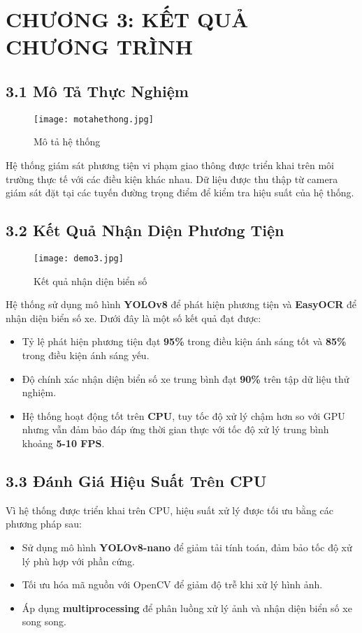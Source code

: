 \documentclass[conference]{IEEEtran}
\begin{document}
\section{CHƯƠNG 3: KẾT QUẢ CHƯƠNG TRÌNH}

\subsection{3.1 Mô Tả Thực Nghiệm}
\begin{figure}[H]
    \centering
    \texttt{[image: motahethong.jpg]} %
    \caption{Mô tả hệ thống}
    \label{fig:traffic_monitoring}
\end{figure}
Hệ thống giám sát phương tiện vi phạm giao thông được triển khai trên môi trường thực tế với các điều kiện khác nhau. Dữ liệu được thu thập từ camera giám sát đặt tại các tuyến đường trọng điểm để kiểm tra hiệu suất của hệ thống.

\subsection{3.2 Kết Quả Nhận Diện Phương Tiện}
\begin{figure}[H]
    \centering
    \texttt{[image: demo3.jpg]} %
    \caption{Kết quả nhận diện biển số}
    \label{fig:traffic_monitoring}
\end{figure}
Hệ thống sử dụng mô hình \textbf{YOLOv8} để phát hiện phương tiện và \textbf{EasyOCR} để nhận diện biển số xe. Dưới đây là một số kết quả đạt được:
\begin{itemize}
    \item Tỷ lệ phát hiện phương tiện đạt \textbf{95\%} trong điều kiện ánh sáng tốt và \textbf{85\%} trong điều kiện ánh sáng yếu.
    \item Độ chính xác nhận diện biển số xe trung bình đạt \textbf{90\%} trên tập dữ liệu thử nghiệm.
    \item Hệ thống hoạt động tốt trên \textbf{CPU}, tuy tốc độ xử lý chậm hơn so với GPU nhưng vẫn đảm bảo đáp ứng thời gian thực với tốc độ xử lý trung bình khoảng \textbf{5-10 FPS}.
\end{itemize}

\subsection{3.3 Đánh Giá Hiệu Suất Trên CPU}
Vì hệ thống được triển khai trên CPU, hiệu suất xử lý được tối ưu bằng các phương pháp sau:
\begin{itemize}
    \item Sử dụng mô hình \textbf{YOLOv8-nano} để giảm tải tính toán, đảm bảo tốc độ xử lý phù hợp với phần cứng.
    \item Tối ưu hóa mã nguồn với OpenCV để giảm độ trễ khi xử lý hình ảnh.
    \item Áp dụng \textbf{multiprocessing} để phân luồng xử lý ảnh và nhận diện biển số xe song song.
\end{itemize}
\end{document}
